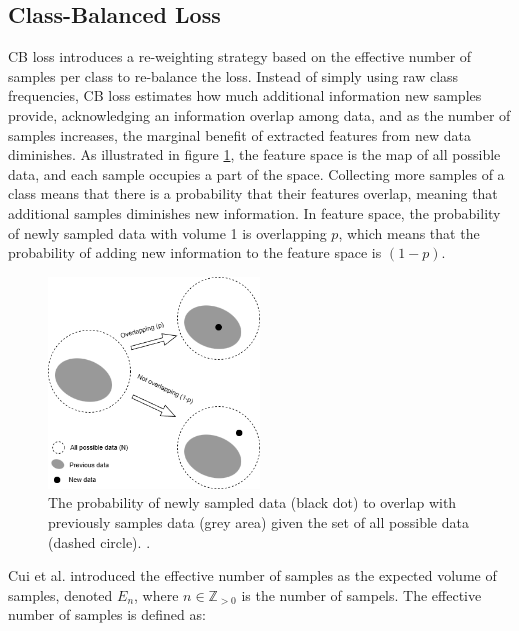 \subsection{Class-Balanced Loss}
\label{sec:cb_loss}
CB loss \cite{cui2019classbalancedlossbasedeffective} introduces a re-weighting strategy based on the effective number of samples per class to re-balance the loss. Instead of simply using raw class frequencies, CB loss estimates how much additional information new samples provide, acknowledging an information overlap among data, and as the number of samples increases, the marginal benefit of extracted features from new data diminishes. As illustrated in figure \ref{fig:cb_featue_space}, the feature space is the map of all possible data, and each sample occupies a part of the space. Collecting more samples of a class means that there is a probability that their features overlap, meaning that additional samples diminishes new information.
In feature space, the probability of newly sampled data with volume 1 is overlapping $p$, which means that the probability of adding new information to the feature space is $(1-p)$. 


\begin{figure}[h!]
    \centering
    \includegraphics[width=0.5\textwidth]{Images/featurespace.drawio.png}
    \caption{The probability of newly sampled data (black dot) to overlap with previously samples data (grey area) given the set of all possible data (dashed circle). \cite{cui2019classbalancedlossbasedeffective}.}
    \label{fig:cb_featue_space}
\end{figure}

\noindent Cui et al. \cite{cui2019classbalancedlossbasedeffective} introduced the effective number of samples as the expected volume of samples, denoted $E_n$, where $n \in \mathbb{Z}_{>0}$ is the number of sampels. The effective number of samples 
is defined as:

